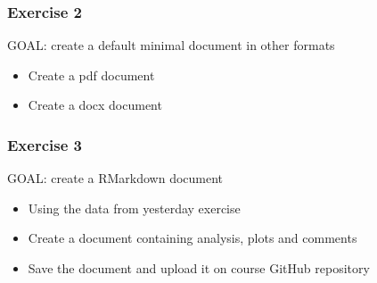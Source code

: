 \documentclass{beamer}
\begin{document}
\begin{frame}
    \frametitle{Exercise 2}
    {\sc GOAL: create a default minimal document in other formats}
    \begin{itemize}
        \item Create a pdf document
        \item Create a docx document
    \end{itemize}
\end{frame}

\begin{frame}
    \frametitle{Exercise 3}
    {\sc GOAL: create a RMarkdown document}
    \begin{itemize}
        \item Using the data from yesterday exercise
        \item Create a document containing analysis, plots and comments
		\item Save the document and upload it on course GitHub repository
    \end{itemize}
\end{frame}
\end{document}
